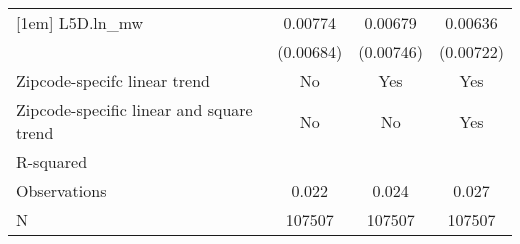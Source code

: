 {\begin{tabular}{l*{3}{c}}
[1em]
L5D.ln\_mw &  0.00774         &  0.00679         &  0.00636         \\
          &(0.00684)         &(0.00746)         &(0.00722)         \\
\hline
Zipcode-specifc linear trend&       No         &      Yes         &      Yes         \\
Zipcode-specific linear and square trend&       No         &       No         &      Yes         \\
R-squared &                  &                  &                  \\
Observations&    0.022         &    0.024         &    0.027         \\
N         &   107507         &   107507         &   107507         \\
\hline\hline
\end{tabular}
}
